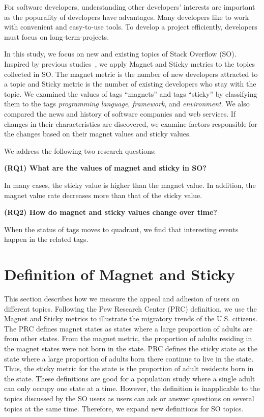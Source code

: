 \documentclass[english,preprint,JIP,technote]{ipsj}
\begin{document}
For software developers, understanding other developers' interests are important as the popurality of developers have advantages. Many developers like to work with convenient and easy-to-use tools. To develop a project efficiently, developers must focus on long-term-projects. 

In this study, we focus on new and existing topics of Stack Overflow (SO). Inspired by previous studies~\cite{yamashita2016magnet}, we apply Magnet and Sticky metrics to the topics collected in SO. 
The magnet metric is the number of new developers attracted to a topic and Sticky metric is the number of existing developers who stay with the topic. 
We examined the values of tags ``magnets'' and tags ``sticky'' by classifying them to the tags \emph{programming language}, \emph{framework}, and \emph{environment}. We also compared the news and history of software  companies and web services. If changes in their characteristics are discovered, we examine factors responsible for the changes based on their magnet values and sticky values. 

We address the following two research questions:

\noindent \textbf{(RQ1) What are the values of magnet and sticky in SO?}\par
In many cases, the sticky value is higher than the magnet value. In addition, the magnet value rate decreases more than that of the sticky value.

\noindent \textbf{(RQ2) How do magnet and sticky values change over time?}\par
When the status of tags moves to quadrant, we find that interesting events happen in the related tags.

\section{Definition of Magnet and Sticky} \label{magnet}
This section describes how we measure the appeal and adhesion of users on different topics. Following the Pew Research Center (PRC) definition, we use the Magnet and Sticky metrics to illustrate the migratory trends of the U.S. citizens. The PRC defines magnet states as states where a large proportion of adults are from other states. From the magnet metric, the proportion of adults residing in the magnet states were not born in the state. PRC defines the sticky state as the state where a large proportion of adults born there continue to live in the state. Thus, the sticky metric for the state is the proportion of adult residents born in the state. These definitions are good for a population study where a single adult can only occupy one state at a time. However, the definition is inapplicable to the topics discussed by the SO users as users can ask or answer questions on several topics at the same time. Therefore, we expand new definitions for SO topics.
\end{document}
